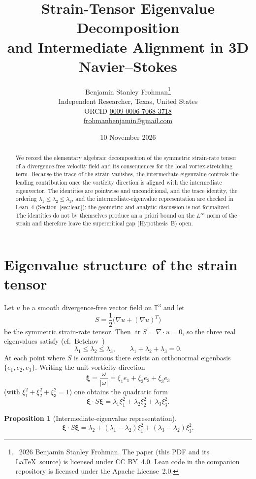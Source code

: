 \documentclass[11pt,a4paper]{article}
\title{Strain-Tensor Eigenvalue Decomposition\\and Intermediate Alignment in 3D Navier--Stokes}
\author{Benjamin Stanley Frohman\thanks{\textcopyright\ 2026 Benjamin Stanley Frohman. The paper (this PDF and its \LaTeX\ source) is licensed under CC BY~4.0. Lean code in the companion repository is licensed under the Apache License~2.0.}\\\small Independent Researcher, Texas, United States\\\small ORCID \href{https://orcid.org/0009-0006-7068-3718}{0009-0006-7068-3718}\\\small \href{mailto:frohmanbenjamin@gmail.com}{frohmanbenjamin@gmail.com}}
\date{10 November 2026}
\newtheorem{proposition}[theorem]{Proposition}
\begin{document}
\maketitle

\begin{abstract}
We record the elementary algebraic decomposition of the symmetric strain-rate tensor of a divergence-free velocity field and its consequences for the local vortex-stretching term. Because the trace of the strain vanishes, the intermediate eigenvalue controls the leading contribution once the vorticity direction is aligned with the intermediate eigenvector. The identities are pointwise and unconditional, and the trace identity, the ordering \(\lambda_1\le\lambda_2\le\lambda_3\), and the intermediate-eigenvalue representation are checked in Lean~4 (Section~\ref{sec:lean}); the geometric and analytic discussion is not formalized. The identities do not by themselves produce an a priori bound on the \(L^\infty\) norm of the strain and therefore leave the supercritical gap (Hypothesis~B) open.
\end{abstract}

\section{Eigenvalue structure of the strain tensor}

Let \(u\) be a smooth divergence-free vector field on \(\mathbb{T}^3\) and let
\[
S=\frac12\bigl(\nabla u+(\nabla u)^T\bigr)
\]
be the symmetric strain-rate tensor. Then \(\operatorname{tr}S=\nabla\cdot u=0\), so the three real eigenvalues satisfy (cf.\ Betchov~\cite{Betchov1956})
\begin{equation}\label{eq:trace}
\lambda_1\le\lambda_2\le\lambda_3,\qquad\lambda_1+\lambda_2+\lambda_3=0.
\end{equation}
At each point where \(S\) is continuous there exists an orthonormal eigenbasis \(\{e_1,e_2,e_3\}\). Writing the unit vorticity direction
\[
\boldsymbol{\xi}=\frac{\omega}{|\omega|}=\xi_1 e_1+\xi_2 e_2+\xi_3 e_3
\]
(with \(\xi_1^2+\xi_2^2+\xi_3^2=1\)) one obtains the quadratic form
\begin{equation}\label{eq:quadratic}
\boldsymbol{\xi}\cdot S\boldsymbol{\xi}=\lambda_1\xi_1^2+\lambda_2\xi_2^2+\lambda_3\xi_3^2.
\end{equation}

\begin{proposition}[Intermediate-eigenvalue representation]
\[
\boldsymbol{\xi}\cdot S\boldsymbol{\xi}
=\lambda_2+(\lambda_1-\lambda_2)\xi_1^2+(\lambda_3-\lambda_2)\xi_3^2.
\]
\end{proposition}
\end{document}
